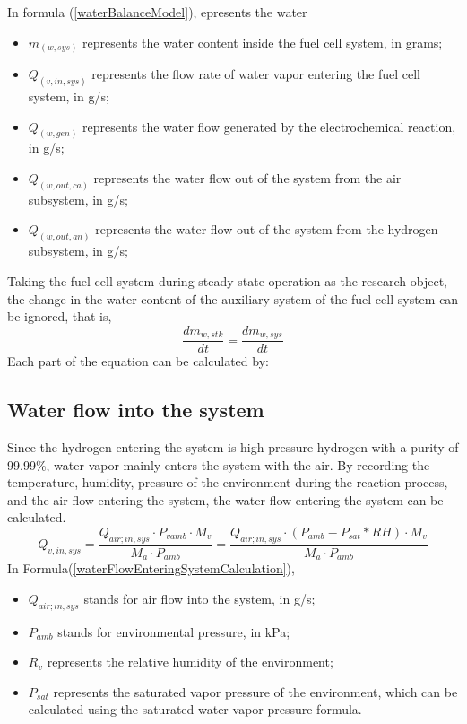 In formula (\ref{waterBalanceModel}), epresents the water
\begin{itemize}
	\item $m_(w,sys)$ represents the water content inside the fuel cell system, in grams; %
	\item $Q_(v,in,sys)$ represents the flow rate of water vapor entering the fuel cell system, in g/s; %
	\item $Q_(w,gen)$ represents the water flow generated by the electrochemical reaction, in g/s; %
	\item $Q_(w,out,ca)$ represents the water flow out of the system from the air subsystem, in g/s; %
	\item $Q_(w,out,an)$ represents the water flow out of the system from the hydrogen subsystem, in g/s; %
\end{itemize}
Taking the fuel cell system during steady-state operation as the research object, the change in the water content of the auxiliary system of the fuel cell system can be ignored, that is,
\begin{equation}\label{changeInWaterContent}
	\frac{d m_{w,s t k}}{d t}=\frac{d m_{w,s y s}}{d t}
\end{equation}
Each part of the equation can be calculated by:
\subsection*{Water flow into the system}
Since the hydrogen entering the system is high-pressure hydrogen with a purity of 99.99\%, water vapor mainly enters the system with the air. By recording the temperature, humidity, pressure of the environment during the reaction process, and the air flow entering the system, the water flow entering the system can be calculated.
\begin{equation}\label{waterFlowEnteringSystemCalculation}
	Q_{v,i n,s y s}={\frac{Q_{a i r;i n,s y s}\cdot P_{v a m b} \cdot M_{v}}{M_{a} \cdot P_{a m b}}}={\frac{Q_{a i r;i n,s y s}\cdot (P_{a m b} - P_{s a t} \ast RH)\cdot M_{v}}{M_{a} \cdot P_{a m b}}}
\end{equation}
In Formula(\ref{waterFlowEnteringSystemCalculation}),
\begin{itemize}
	\item $Q_{a i r;i n,s y s}$ stands for air flow into the system, in g/s;
	\item $P_{a m b}$ stands for environmental pressure, in kPa;
	\item $R_{v}$ represents the relative humidity of the environment;
	\item $P_{sat}$ represents the saturated vapor pressure of the environment, which can be calculated using the saturated water vapor pressure formula.
\end{itemize}

